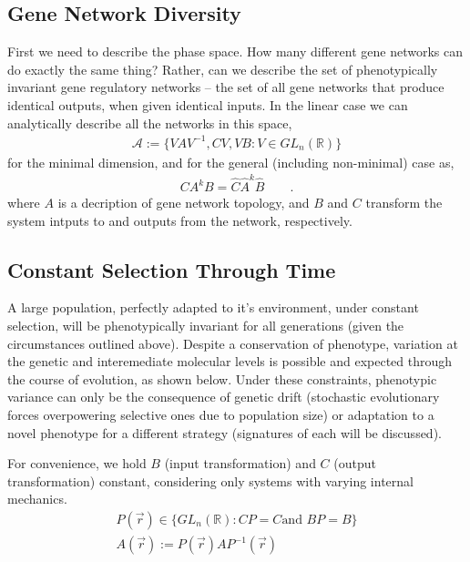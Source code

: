 \documentclass[11 pt]{article}
\newcommand{\1}{\mathbbm{1}}
\begin{document}
    \subsection{Gene Network Diversity}
      First we need to describe the phase space. How many different gene networks can do exactly the same thing? Rather, can we describe the set of phenotypically invariant gene regulatory networks -- the set of all gene networks that produce identical outputs, when given identical inputs. In the linear case we can analytically describe all the networks in this space,
      \begin{align*}
        \mathcal{A} := \{ VAV^{-1}, CV, VB : V \in GL_{n}(\mathbb{R}) \}
      \end{align*}
      for the minimal dimension, and for the general (including non-minimal) case as,
      \begin{align*}
        CA^{k}B = \widehat{C} \widehat{A}^{k} \widehat{B} \qquad .
      \end{align*}
      where $A$ is a decription of gene network topology, and $B$ and $C$ transform the system intputs to and outputs from the network, respectively. 

  \subsection{Constant Selection Through Time}

    A large population, perfectly adapted to it's environment, under constant selection, will be phenotypically invariant for all generations (given the circumstances outlined above). Despite a conservation of phenotype, variation at the genetic and interemediate molecular levels is possible and expected through the course of evolution, as shown below. Under these constraints, phenotypic variance can only be the consequence of genetic drift (stochastic evolutionary forces overpowering selective ones due to population size) or adaptation to a novel phenotype for a different strategy (signatures of each will be discussed).

      For convenience, we hold $B$ (input transformation) and $C$ (output transformation) constant, considering only systems with varying internal mechanics.
      \begin{align*}
        P(\vec{r}) \in \{ GL_{n}(\mathbb{R}) : CP = C \text{and } BP = B \} \\
        A(\vec{r}) := P(\vec{r}) A P^{-1}(\vec{r})
      \end{align*}
\end{document}
